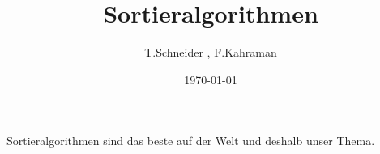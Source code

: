 \documentclass{article}
\title{Sortieralgorithmen}
\author{T.Schneider , F.Kahraman}
\date{\today}
\begin{document}
\maketitle
Sortieralgorithmen sind das beste auf der Welt und deshalb unser Thema.
\end{document}
